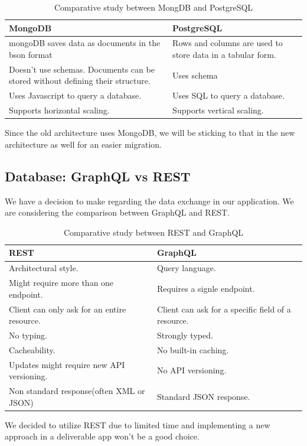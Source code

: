\begin{table}[h!]
  \centering
  \renewcommand{\arraystretch}{1.5} 
  \caption{Comparative study between MongDB and PostgreSQL}
  \label{tab: comparative_study_between_MongoDB_and_PostgreSQL}
  \begin{tabularx}{\textwidth}{|>{\centering\arraybackslash}X|>{\centering\arraybackslash}X|}
      \hline
      \rowcolor{blue!20} 
      \textbf{MongoDB} & \textbf{PostgreSQL} \\
      \hline
      mongoDB saves data as documents in the bson format & Rows and columns are used to store data in a tabular form. \\
      \hline
      Doesn't use schemas. Documents can be stored without defining their structure. & Uses schema \\
      \hline
      Uses Javascript to query a database. & Uses SQL to query a database.  \\
      \hline
      Supports horizontal scaling. & Supports vertical scaling.  \\
      \hline
  \end{tabularx}
\end{table}
Since the old architecture uses MongoDB, we will be sticking to that in the
new architecture as well for an easier migration.


\subsection{Database: GraphQL vs REST}
We have a decision to make regarding the data exchange in our application. We are considering the comparison between GraphQL and REST.


\begin{table}[h!]
  \centering
  \renewcommand{\arraystretch}{1.5} 
  \caption{Comparative study between REST and GraphQL }
  \label{tab: comparative_study_between_REST_and_GraphQL}
  \begin{tabularx}{\textwidth}{|>{\centering\arraybackslash}X|>{\centering\arraybackslash}X|}
      \hline
      \rowcolor{blue!20} 
      \textbf{REST} & \textbf{GraphQL} \\
      \hline
      Architectural style. & Query language. \\
      \hline
      Might require more than one endpoint. & Requires a signle endpoint. \\
      \hline
      Client can only ask for an entire resource. & Client can ask for a specific field of a resource.  \\
      \hline
      No typing.& Strongly typed.  \\
      \hline
      Cacheability. & No built-in caching.  \\
      \hline
       Updates might require new API versioning. & No API versioning.  \\
      \hline
        Non standard response(often XML or JSON) & Standard JSON response.  \\
      \hline
  \end{tabularx}
\end{table}
We decided to utilize REST due to limited time and implementing a new approach in a deliverable app won't be a good choice.


